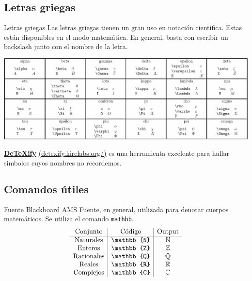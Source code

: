 \documentclass[../slides.tex]{subfiles}
\begin{document}
    \subsection{Letras griegas}

    \begin{frame}{Letras griegas}
        Las letras griegas tienen un gran uso en notación cientifica. Estas están disponibles en el modo matemática. En general, basta con escribir un backslash junto con el nombre de la letra. 
        \begin{center}
        \includegraphics[scale=0.23]{greek_letters}
        \end{center}
        \begin{block}{}
            \href{https://detexify.kirelabs.org/classify.html}{\textbf{DeTeXify}} \href{https://detexify.kirelabs.org/classify.html}{(detexify.kirelabs.org/)} es una herramienta excelente para hallar simbolos cuyos nombres no recordemos.
        \end{block}
    \end{frame} 
    
    \subsection{Comandos útiles}
    \begin{frame}{Fuente Blackboard AMS}
        Fuente, en general, utilizada para denotar cuerpos matemáticos. Se utiliza el comando \texttt{mathbb}.
            \[ 
                \begin{array}{c|c|c}
                	\text{Conjunto} & \text{Código} & \text{Output}\\
                	\hline
                	\text{Naturales} & \text{\texttt{\textbackslash mathbb \{N\}}} & \mathbb{N}\\
                	\text{Enteros} & \text{\texttt{\textbackslash mathbb \{Z\}}} & \mathbb{Z}\\
                	\text{Racionales} & \text{\texttt{\textbackslash mathbb \{Q\}}} & \mathbb{Q}\\
                	\text{Reales} & \text{\texttt{\textbackslash mathbb \{R\}}} & \mathbb{R}\\
                	\text{Complejos} & \text{\texttt{\textbackslash mathbb \{C\}}} & \mathbb{C}
                \end{array}
            \]
    \end{frame} 
    
\end{document}
